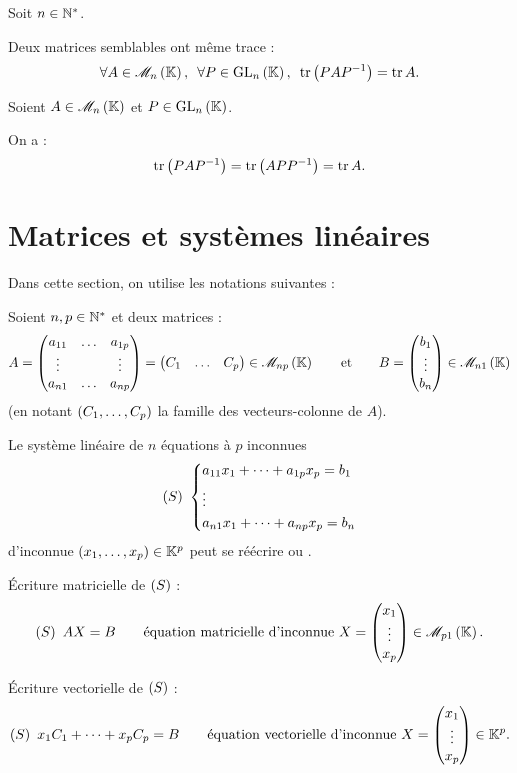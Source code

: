 \begin{cor}
Soit \(n\in\mathbb{N}^*\).

Deux matrices semblables ont même trace : \[\quantifs{\forall A\in\M{n};\forall P\in\GL{n}}\tr\paren{PAP\inv}=\tr A.\]
\end{cor}

\begin{dem}
Soient \(A\in\M{n}\) et \(P\in\GL{n}\).

On a : \[\operatorname{tr}\left(PAP^{-1}\right)=\operatorname{tr}\left(APP^{-1}\right)=\operatorname{tr} A.\]
\end{dem}

\section{Matrices et systèmes linéaires}

Dans cette section, on utilise les notations suivantes :

Soient \(n,p\in\mathbb{N}^*\) et deux matrices : \[A=\begin{pmatrix}
a_{11} & \dots & a_{1p} \\
\vdots &  & \vdots \\
a_{n1} & \dots & a_{np}
\end{pmatrix}=\begin{pmatrix}
C_1 & \dots & C_p
\end{pmatrix}\in\M{np}\qquad\text{et}\qquad B=\tcoords{b_1}{\vdots}{b_n}\in\M{n1}\] (en notant \(\left(C_1,\dots,C_p\right)\) la famille des vecteurs-colonne de \(A\)).

Le système linéaire de \(n\) équations à \(p\) inconnues \[\left(S\right)~\begin{dcases}
a_{11}x_1+\dots+a_{1p}x_p=b_1 \\
\vdots \\
a_{n1}x_1+\dots+a_{np}x_p=b_n
\end{dcases}\] d'inconnue \(\left(x_1,\dots,x_p\right)\in\mathbb{K}^p\) peut se réécrire  ou .

Écriture matricielle de \(\left(S\right)\) : \[\paren{S}~AX=B\qquad\text{équation matricielle d'inconnue }X=\tcoords{x_1}{\vdots}{x_p}\in\M{p1}.\]

Écriture vectorielle de \(\left(S\right)\) : \[\left(S\right)~x_1C_1+\dots+x_pC_p=B\qquad\text{équation vectorielle d'inconnue }X=\begin{pmatrix}x_1\\\vdots\\x_p\end{pmatrix}\in\mathbb{K}^p.\]

